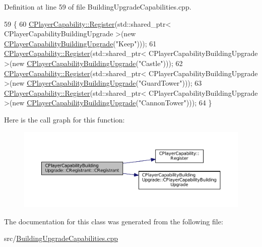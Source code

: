 Definition at line 59 of file Building\+Upgrade\+Capabilities.\+cpp.


\begin{DoxyCode}
59                                                         \{
60     \hyperlink{classCPlayerCapability_a7e298018dcde2684451add3cfff065f7}{CPlayerCapability::Register}(std::shared\_ptr<
       CPlayerCapabilityBuildingUpgrade >(\textcolor{keyword}{new} \hyperlink{classCPlayerCapabilityBuildingUpgrade_a80ccec4b17a9e43914bec537dcbe1b9e}{CPlayerCapabilityBuildingUpgrade}(\textcolor{stringliteral}{"Keep"})));   
61     \hyperlink{classCPlayerCapability_a7e298018dcde2684451add3cfff065f7}{CPlayerCapability::Register}(std::shared\_ptr<
       CPlayerCapabilityBuildingUpgrade >(\textcolor{keyword}{new} \hyperlink{classCPlayerCapabilityBuildingUpgrade_a80ccec4b17a9e43914bec537dcbe1b9e}{CPlayerCapabilityBuildingUpgrade}(\textcolor{stringliteral}{"Castle"})));
62     \hyperlink{classCPlayerCapability_a7e298018dcde2684451add3cfff065f7}{CPlayerCapability::Register}(std::shared\_ptr<
       CPlayerCapabilityBuildingUpgrade >(\textcolor{keyword}{new} \hyperlink{classCPlayerCapabilityBuildingUpgrade_a80ccec4b17a9e43914bec537dcbe1b9e}{CPlayerCapabilityBuildingUpgrade}(\textcolor{stringliteral}{"GuardTower"})));   
63     \hyperlink{classCPlayerCapability_a7e298018dcde2684451add3cfff065f7}{CPlayerCapability::Register}(std::shared\_ptr<
       CPlayerCapabilityBuildingUpgrade >(\textcolor{keyword}{new} \hyperlink{classCPlayerCapabilityBuildingUpgrade_a80ccec4b17a9e43914bec537dcbe1b9e}{CPlayerCapabilityBuildingUpgrade}(\textcolor{stringliteral}{"CannonTower"})));
64 \}
\end{DoxyCode}
Here is the call graph for this function\+:\nopagebreak
\begin{figure}[H]
\begin{center}
\leavevmode
\includegraphics[width=350pt]{classCPlayerCapabilityBuildingUpgrade_1_1CRegistrant_a85e216de0285430da642fa71f2a79a34_cgraph}
\end{center}
\end{figure}


The documentation for this class was generated from the following file\+:\begin{DoxyCompactItemize}
\item 
src/\hyperlink{BuildingUpgradeCapabilities_8cpp}{Building\+Upgrade\+Capabilities.\+cpp}\end{DoxyCompactItemize}
